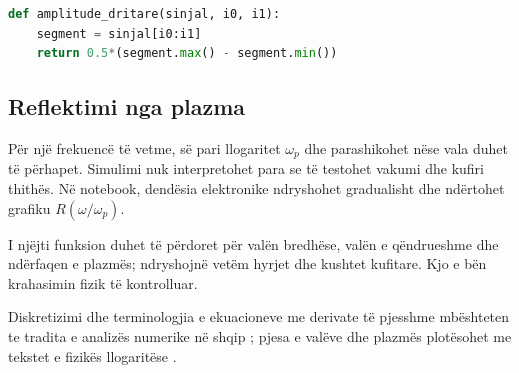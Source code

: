 \begin{lstlisting}[language=Python]
def amplitude_dritare(sinjal, i0, i1):
    segment = sinjal[i0:i1]
    return 0.5*(segment.max() - segment.min())
\end{lstlisting}

\subsection{Reflektimi nga plazma}
Për një frekuencë të vetme, së pari llogaritet $\omega_p$ dhe parashikohet nëse vala duhet të përhapet. Simulimi nuk interpretohet para se të testohet vakumi dhe kufiri thithës. Në notebook, dendësia elektronike ndryshohet gradualisht dhe ndërtohet grafiku $R(\omega/\omega_p)$.

\begin{lidhje}
I njëjti funksion duhet të përdoret për valën bredhëse, valën e qëndrueshme dhe ndërfaqen e plazmës; ndryshojnë vetëm hyrjet dhe kushtet kufitare. Kjo e bën krahasimin fizik të kontrolluar.
\end{lidhje}

Diskretizimi dhe terminologjia e ekuacioneve me derivate të pjesshme mbështeten te tradita e analizës numerike në shqip \cite{hoxha,hanelli,naco}; pjesa e valëve dhe plazmës plotësohet me tekstet e fizikës llogaritëse \cite{giordano,landau}.
